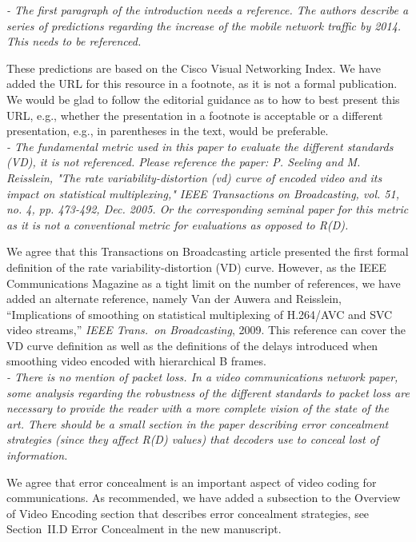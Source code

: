 \documentclass[11pt, draftclsnofoot, onecolumn]{IEEEtran}
\begin{document}
{{\noindent \textit{- The first paragraph of the introduction needs
    a reference. The authors describe a series of predictions
    regarding the increase of the mobile network traffic by 2014. This
    needs to be referenced.}

These predictions are based on the Cisco Visual Networking
Index. We have added the URL for this resource in a footnote,
as it is not a formal publication. We would be glad to follow
the editorial guidance as to how to best present this URL, e.g.,
whether the presentation in a footnote is acceptable or a different
presentation, e.g., in parentheses in the text, would be
preferable.\\

\noindent \textit{- The fundamental metric used in this paper to
    evaluate the different standards (VD), it is not
    referenced. Please reference the paper: P. Seeling and
    M. Reisslein, "The rate variability-distortion (vd) curve of
    encoded video and its impact on statistical multiplexing," IEEE
    Transactions on Broadcasting, vol. 51, no. 4, pp. 473-492,
    Dec. 2005. Or the corresponding seminal paper for this metric as
    it is not a conventional metric for evaluations as opposed to
    R(D).}

We agree that this Transactions on Broadcasting article presented
the first formal definition of the rate variability-distortion (VD)
curve. However, as the IEEE Communications Magazine as a tight limit
on the number of references, we have added an alternate reference,
namely Van der Auwera and Reisslein, ``Implications of smoothing on statistical
multiplexing of H.264/AVC and SVC video streams,'' \textit{IEEE Trans.\
on Broadcasting}, 2009. This reference can cover the VD curve definition
as well as the definitions of the delays introduced when smoothing
video encoded with hierarchical B frames.\\

\noindent \textit{- There is no mention of packet loss. In a video
    communications network paper, some analysis regarding the
    robustness of the different standards to packet loss are necessary
    to provide the reader with a more complete vision of the state of
    the art. There should be a small section in the paper describing
    error concealment strategies (since they affect R(D) values) that
    decoders use to conceal lost of information.}

We agree that error concealment is an important aspect of video coding
for communications. As recommended, we have added a subsection to the
Overview of Video Encoding section that describes error concealment
strategies, see Section~II.D Error Concealment in the new
manuscript. \\

}}
\end{document}

